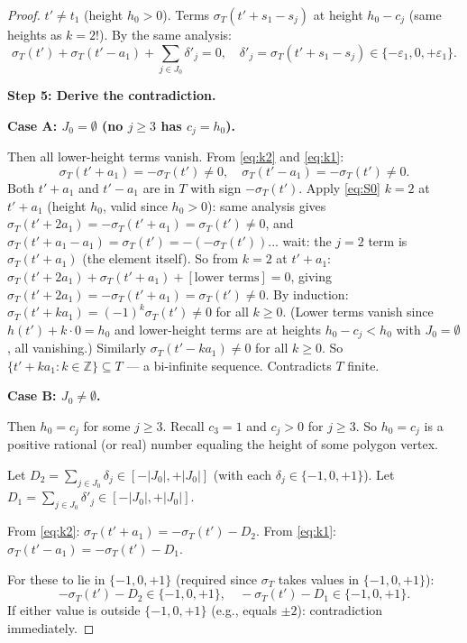 \begin{proof}
$t' \neq t_1$ (height $h_0>0$). Terms $\sigma_T(t'+s_1-s_j)$ at height $h_0-c_j$ (same heights as $k=2$!).
By the same analysis:
\begin{equation}\label{eq:k1}
  \sigma_T(t') + \sigma_T(t'-a_1) + \sum_{j \in J_0} \delta'_j = 0,
  \quad \delta'_j = \sigma_T(t'+s_1-s_j) \in \{-\varepsilon_1, 0, +\varepsilon_1\}.
\end{equation}

\medskip
\noindent\textbf{Step 5: Derive the contradiction.}

\textbf{Case A: $J_0 = \emptyset$ (no $j \geq 3$ has $c_j = h_0$).}

Then all lower-height terms vanish.  From \eqref{eq:k2} and \eqref{eq:k1}:
\[
  \sigma_T(t'+a_1) = -\sigma_T(t') \neq 0, \quad \sigma_T(t'-a_1) = -\sigma_T(t') \neq 0.
\]
Both $t'+a_1$ and $t'-a_1$ are in $T$ with sign $-\sigma_T(t')$.  Apply \eqref{eq:S0}
$k=2$ at $t'+a_1$ (height $h_0$, valid since $h_0 > 0$):
same analysis gives $\sigma_T(t'+2a_1) = -\sigma_T(t'+a_1) = \sigma_T(t') \neq 0$, and
$\sigma_T(t'+a_1-a_1) = \sigma_T(t') = -(-\sigma_T(t'))$... wait: the $j=2$ term is
$\sigma_T(t'+a_1)$ (the element itself). So from $k=2$ at $t'+a_1$:
$\sigma_T(t'+2a_1)+\sigma_T(t'+a_1)+[\text{lower terms}]=0$, giving
$\sigma_T(t'+2a_1) = -\sigma_T(t'+a_1) = \sigma_T(t') \neq 0$.
By induction: $\sigma_T(t'+ka_1) = (-1)^k \sigma_T(t') \neq 0$ for all $k \geq 0$.
(Lower terms vanish since $h(t')+k\cdot 0 = h_0$ and lower-height terms are at heights
$h_0-c_j < h_0$ with $J_0=\emptyset$, all vanishing.)
Similarly $\sigma_T(t'-ka_1) \neq 0$ for all $k \geq 0$.
So $\{t'+ka_1 : k \in \mathbb{Z}\} \subseteq T$ — a bi-infinite sequence.
Contradicts $T$ finite. \checkmark

\textbf{Case B: $J_0 \neq \emptyset$.}

Then $h_0 = c_j$ for some $j \geq 3$.  Recall $c_3 = 1$ and $c_j > 0$ for $j \geq 3$.
So $h_0 = c_j$ is a positive rational (or real) number equaling the height of some
polygon vertex.

Let $D_2 = \sum_{j \in J_0} \delta_j \in [-|J_0|,+|J_0|]$ (with each $\delta_j \in \{-1,0,+1\}$).
Let $D_1 = \sum_{j \in J_0} \delta'_j \in [-|J_0|,+|J_0|]$.

From \eqref{eq:k2}: $\sigma_T(t'+a_1) = -\sigma_T(t') - D_2$.
From \eqref{eq:k1}: $\sigma_T(t'-a_1) = -\sigma_T(t') - D_1$.

For these to lie in $\{-1,0,+1\}$ (required since $\sigma_T$ takes values in $\{-1,0,+1\}$):
\[
  -\sigma_T(t') - D_2 \in \{-1,0,+1\}, \quad -\sigma_T(t') - D_1 \in \{-1,0,+1\}.
\]
If either value is outside $\{-1,0,+1\}$ (e.g., equals $\pm 2$): contradiction immediately. \checkmark


\end{proof}
